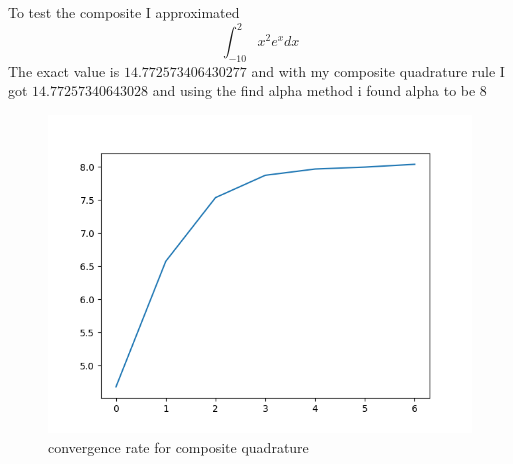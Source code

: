 \documentclass{article}
\begin{document}
		
		To test the composite I approximated $$\int_{-10}^{2}x^2e^xdx$$ The exact value is $14.772573406430277$ and with my composite quadrature rule I got $14.77257340643028$ and using the find alpha method i found alpha to be 8
		
		
		\begin{figure}[hbt!]
			\centering
			\includegraphics[width=.75\linewidth]{alpha_plot.png}
			\caption{convergence rate for composite quadrature}
			\label{fig:convergence rate for composite quadrature}
		\end{figure}
		
\end{document}
